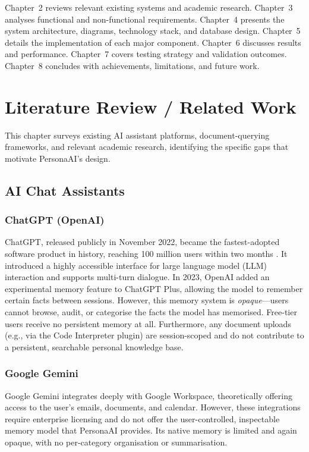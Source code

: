 \documentclass[12pt,a4paper]{report}
\begin{document}
Chapter~2 reviews relevant existing systems and academic research. Chapter~3 analyses functional and non-functional requirements. Chapter~4 presents the system architecture, diagrams, technology stack, and database design. Chapter~5 details the implementation of each major component. Chapter~6 discusses results and performance. Chapter~7 covers testing strategy and validation outcomes. Chapter~8 concludes with achievements, limitations, and future work.

\chapter{Literature Review / Related Work}

This chapter surveys existing AI assistant platforms, document-querying frameworks, and relevant academic research, identifying the specific gaps that motivate PersonaAI's design.

\section{AI Chat Assistants}

\subsection{ChatGPT (OpenAI)}
ChatGPT, released publicly in November 2022, became the fastest-adopted software product in history, reaching 100 million users within two months \cite{chatgpt2022}. It introduced a highly accessible interface for large language model (LLM) interaction and supports multi-turn dialogue. In 2023, OpenAI added an experimental memory feature to ChatGPT Plus, allowing the model to remember certain facts between sessions. However, this memory system is \textit{opaque}—users cannot browse, audit, or categorise the facts the model has memorised. Free-tier users receive no persistent memory at all. Furthermore, any document uploads (e.g., via the Code Interpreter plugin) are session-scoped and do not contribute to a persistent, searchable personal knowledge base.

\subsection{Google Gemini}
Google Gemini integrates deeply with Google Workspace, theoretically offering access to the user's emails, documents, and calendar. However, these integrations require enterprise licensing and do not offer the user-controlled, inspectable memory model that PersonaAI provides. Its native memory is limited and again opaque, with no per-category organisation or summarisation.
\end{document}

